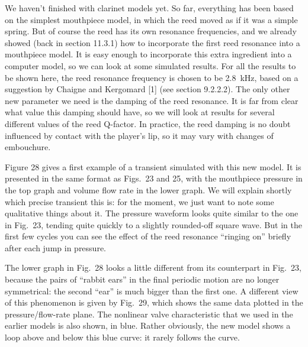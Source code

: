   We haven’t finished with clarinet models yet. So far, everything has been 
  based on the simplest mouthpiece model, in which the reed moved as if it was 
  a simple spring. But of course the reed has its own resonance frequencies, 
  and we already showed (back in section 11.3.1) how to incorporate the first 
  reed resonance into a mouthpiece model. It is easy enough to incorporate this 
  extra ingredient into a computer model, so we can look at some simulated 
  results. For all the results to be shown here, the reed resonance frequency 
  is chosen to be 2.8~kHz, based on a suggestion by Chaigne and Kergomard [1] 
  (see section 9.2.2.2). The only other new parameter we need is the damping of 
  the reed resonance. It is far from clear what value this damping should have, 
  so we will look at results for several different values of the reed Q-factor. 
  In practice, the reed damping is no doubt influenced by contact with the 
  player's lip, so it may vary with changes of embouchure. 

  Figure 28 gives a first example of a transient simulated with this new model. 
  It is presented in the same format as Figs.\ 23 and 25, with the mouthpiece 
  pressure in the top graph and volume flow rate in the lower graph. We will 
  explain shortly which precise transient this is: for the moment, we just want 
  to note some qualitative things about it. The pressure waveform looks quite 
  similar to the one in Fig.\ 23, tending quite quickly to a slightly 
  rounded-off square wave. But in the first few cycles you can see the effect 
  of the reed resonance “ringing on” briefly after each jump in pressure. 


  The lower graph in Fig.\ 28 looks a little different from its counterpart in 
  Fig.\ 23, because the pairs of “rabbit ears” in the final periodic motion are 
  no longer symmetrical: the second “ear” is much bigger than the first one. A 
  different view of this phenomenon is given by Fig.\ 29, which shows the same 
  data plotted in the pressure/flow-rate plane. The nonlinear valve 
  characteristic that we used in the earlier models is also shown, in blue. 
  Rather obviously, the new model shows a loop above and below this blue curve: 
  it rarely follows the curve. 


